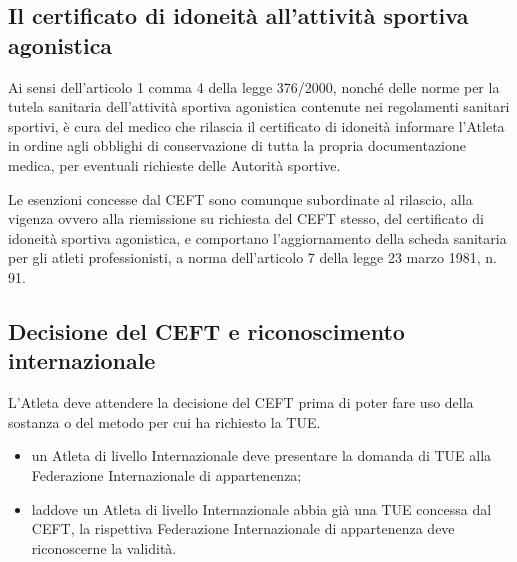 \subsection{Il certificato di idoneità all'attività sportiva agonistica}

Ai sensi dell'articolo 1 comma 4 della legge 376/2000, nonché delle norme per la tutela
sanitaria dell'attività sportiva agonistica contenute nei regolamenti sanitari sportivi, è cura
del medico che rilascia il certificato di idoneità informare l'Atleta in ordine agli obblighi di
conservazione di tutta la propria documentazione medica, per eventuali richieste delle Autorità
sportive.

Le esenzioni concesse dal CEFT sono comunque subordinate al rilascio, alla vigenza ovvero alla
riemissione su richiesta del CEFT stesso, del certificato di idoneità sportiva agonistica, e
comportano l'aggiornamento della scheda sanitaria per gli atleti professionisti, a norma
dell'articolo 7 della legge 23 marzo 1981, n.\,91.

\subsection{Decisione del CEFT e riconoscimento internazionale}

L'Atleta deve attendere la decisione del CEFT prima di poter fare uso della sostanza o del
metodo per cui ha richiesto la TUE.

\begin{itemize}
  \item un Atleta di livello Internazionale deve presentare la domanda di TUE alla Federazione
    Internazionale di appartenenza;
  \item laddove un Atleta di livello Internazionale abbia già una TUE concessa dal CEFT, la
    rispettiva Federazione Internazionale di appartenenza deve riconoscerne la validità.
\end{itemize}
